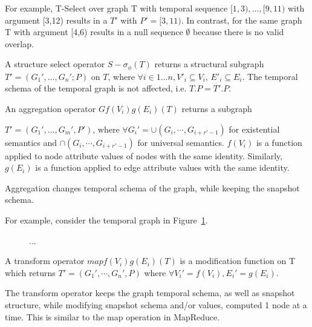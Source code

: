 
For example, T-Select over graph T with temporal sequence
$[1,3),\ldots,[9,11)$ with argument [3,12) results in a $T'$ with $P'
      = [3,11)$.  In contrast, for the same graph T with argument
        [4,6) results in a null sequence $\emptyset$ because there is
          no valid overlap.

\begin{definition}
\label{def:ssel}
A structure select operator $S-\sigma_\phi(T)$ returns a structural
subgraph $T'= (G_1', \ldots, G_n'; P)$ on $T$, where $\forall i \in 1
\ldots n, V'_i \subseteq V_i$, $E'_i \subseteq E_i$. The temporal
schema of the temporal graph is not affected, i.e. $T.P = T'.P$.

\end{definition}

\begin{definition}
\label{def:agg}
An aggregation operator $G f(V_i) g(E_i) (T)$ returns a subgraph 

$T' = (G_1', \ldots, G_m', P')$, where $\forall G_i' = \cup(G_{i},
\cdots, G_{i+r'-1})$ for existential semantics and $\cap(G_{i},
\cdots, G_{i+r'-1})$ for universal semantics.  $f(V_i)$ is a function
applied to node attribute values of nodes with the same identity.
Similarly, $g(E_i)$ is a function applied to edge attribute values
with the same identity. 
\end{definition}

Aggregation changes temporal schema of the graph, while keeping the
snapshot schema.

For example, consider the temporal graph in Figure~\ref{fig:agg}.

\begin{figure}
\label{fig:agg}
\caption{...}
\end{figure}

\begin{definition}
\label{def:transform}
A transform operator $map f(V_i) g(E_i) (T)$ is a modification
function on T which returns $T' = (G_1', \cdots, G_n', P)$ where
$\forall V_i' = f(V_i), E_i' = g(E_i)$.
\end{definition}

The transform operator keeps the graph temporal schema, as well as
snapshot structure, while modifying snapshot schema and/or values,
computed 1 node at a time.  This is similar to the map operation in
MapReduce.

